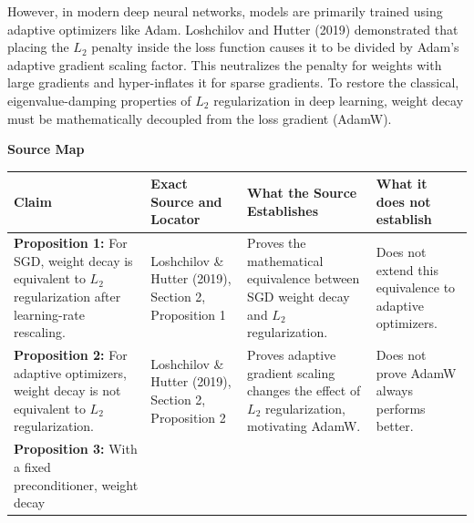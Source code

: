 \documentclass[
  11pt,
]{article}
\newcounter{none} %
\begin{document}
However, in modern deep neural networks, models are primarily trained
using adaptive optimizers like Adam. Loshchilov and Hutter (2019)
demonstrated that placing the \(L_2\) penalty inside the loss function
causes it to be divided by Adam's adaptive gradient scaling factor. This
neutralizes the penalty for weights with large gradients and
hyper-inflates it for sparse gradients. To restore the classical,
eigenvalue-damping properties of \(L_2\) regularization in deep
learning, weight decay must be mathematically decoupled from the loss
gradient (AdamW).

\textbf{Source Map}

{\def\LTcaptype{none} %
\begin{longtable}[]{@{}
  >{\raggedright\arraybackslash}p{}
  >{\raggedright\arraybackslash}p{}
  >{\raggedright\arraybackslash}p{}
  >{\raggedright\arraybackslash}p{}@{}}
\toprule\noalign{}
\begin{minipage}[b]{\linewidth}\raggedright
Claim
\end{minipage} & \begin{minipage}[b]{\linewidth}\raggedright
Exact Source and Locator
\end{minipage} & \begin{minipage}[b]{\linewidth}\raggedright
What the Source Establishes
\end{minipage} & \begin{minipage}[b]{\linewidth}\raggedright
What it does not establish
\end{minipage} \\
\midrule\noalign{}
\endhead
\bottomrule\noalign{}
\endlastfoot
\textbf{Proposition 1:} For SGD, weight decay is equivalent to \(L_2\)
regularization after learning-rate rescaling. & Loshchilov \& Hutter
(2019), Section 2, Proposition 1 & Proves the mathematical equivalence
between SGD weight decay and \(L_2\) regularization. & Does not extend
this equivalence to adaptive optimizers. \\
\textbf{Proposition 2:} For adaptive optimizers, weight decay is not
equivalent to \(L_2\) regularization. & Loshchilov \& Hutter (2019),
Section 2, Proposition 2 & Proves adaptive gradient scaling changes the
effect of \(L_2\) regularization, motivating AdamW. & Does not prove
AdamW always performs better. \\
\textbf{Proposition 3:} With a fixed preconditioner, weight decay

\end{longtable}}
\end{document}
